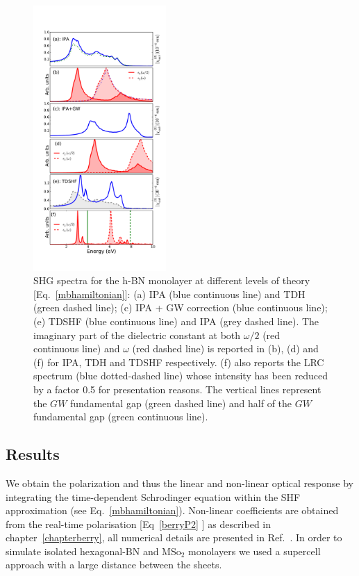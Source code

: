 \begin{figure}[ht]
\centering
\includegraphics[width=0.45\textwidth]{Figures/eps_and_X2}
\caption{\footnotesize{SHG spectra for the h-BN monolayer at different levels of theory [Eq.~\eqref{mbhamiltonian}]: (a) IPA (blue continuous line) and TDH (green dashed line); (c) IPA + GW correction (blue continuous line); (e) TDSHF (blue continuous line) and IPA (grey dashed line). The imaginary part of the dielectric constant at both $\omega/2$ (red continuous line) and $\omega$ (red dashed line) is reported in (b), (d) and (f) for IPA, TDH and TDSHF respectively. (f) also reports the LRC spectrum (blue dotted-dashed line) whose intensity has been reduced by a factor 0.5 for presentation reasons. The vertical lines represent the $GW$ fundamental gap (green dashed line) and half of the $GW$ fundamental gap (green continuous line). \label{absX2bn}}}
\end{figure}  

\subsection{Results}
We obtain the polarization and thus the linear and non-linear optical response by integrating the time-dependent Schrodinger equation within the SHF approximation (see Eq.~\ref{mbhamiltonian}). Non-linear coefficients are obtained from the real-time polarisation [Eq~\ref{berryP2} ] as described in chapter~\ref{chapterberry}, all numerical details are presented in Ref.~\cite{PhysRevB.89.081102}. In order to simulate isolated hexagonal-BN and MSo$_2$ monolayers we used a supercell approach with a large distance between the sheets. 
